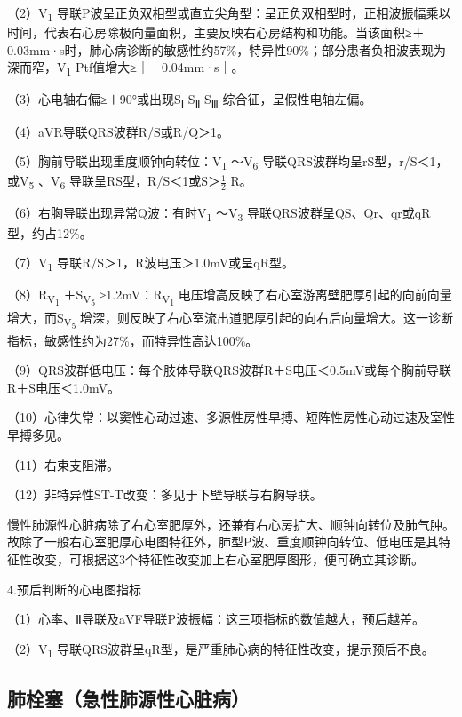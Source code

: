 （2）V\textsubscript{1}
导联P波呈正负双相型或直立尖角型：呈正负双相型时，正相波振幅乘以时间，代表右心房除极向量面积，主要反映右心房结构和功能。当该面积≥＋0.03mm·s时，肺心病诊断的敏感性约57\%，特异性90\%；部分患者负相波表现为深而窄，V\textsubscript{1}
Ptf值增大≥｜－0.04mm·s｜。

（3）心电轴右偏≥＋90°或出现S\textsubscript{Ⅰ} S\textsubscript{Ⅱ}
S\textsubscript{Ⅲ} 综合征，呈假性电轴左偏。

（4）aVR导联QRS波群R/S或R/Q＞1。

（5）胸前导联出现重度顺钟向转位：V\textsubscript{1} ～V\textsubscript{6}
导联QRS波群均呈rS型，r/S＜1，或V\textsubscript{5} 、V\textsubscript{6}
导联呈RS型，R/S＜1或S＞$\frac{1}{2}$ R。

（6）右胸导联出现异常Q波：有时V\textsubscript{1} ～V\textsubscript{3}
导联QRS波群呈QS、Qr、qr或qR型，约占12\%。

（7）V\textsubscript{1} 导联R/S＞1，R波电压＞1.0mV或呈qR型。

（8）R\textsubscript{V\textsubscript{1}}
＋S\textsubscript{V\textsubscript{5}}
≥1.2mV：R\textsubscript{V\textsubscript{1}}
电压增高反映了右心室游离壁肥厚引起的向前向量增大，而S\textsubscript{V\textsubscript{5}}
增深，则反映了右心室流出道肥厚引起的向右后向量增大。这一诊断指标，敏感性约为27\%，而特异性高达100\%。

（9）QRS波群低电压：每个肢体导联QRS波群R＋S电压＜0.5mV或每个胸前导联R＋S电压＜1.0mV。

（10）心律失常：以窦性心动过速、多源性房性早搏、短阵性房性心动过速及室性早搏多见。

（11）右束支阻滞。

（12）非特异性ST-T改变：多见于下壁导联与右胸导联。

慢性肺源性心脏病除了右心室肥厚外，还兼有右心房扩大、顺钟向转位及肺气肿。故除了一般右心室肥厚心电图特征外，肺型P波、重度顺钟向转位、低电压是其特征性改变，可根据这3个特征性改变加上右心室肥厚图形，便可确立其诊断。

4.预后判断的心电图指标

（1）心率、Ⅱ导联及aVF导联P波振幅：这三项指标的数值越大，预后越差。

（2）V\textsubscript{1}
导联QRS波群呈qR型，是严重肺心病的特征性改变，提示预后不良。

\protect\hypertarget{text00050.htmlux5cux23subid598}{}{}

\subsection{肺栓塞（急性肺源性心脏病）}

